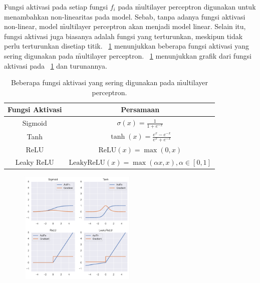     Fungsi aktivasi pada setiap fungsi $f_i$ pada \f{multilayer perceptron} digunakan untuk menambahkan non-linearitas pada model. Sebab, tanpa adanya fungsi aktivasi non-linear, model \f{multilayer perceptron} akan menjadi model linear. Selain itu, fungsi aktivasi juga biasanya adalah fungsi yang terturunkan, meskipun tidak perlu terturunkan disetiap titik. \tab~\ref{tab:activation-function} menunjukkan beberapa fungsi aktivasi yang sering digunakan pada \f{multilayer perceptron}. \pic~\ref{fig:activation-function} menunjukkan grafik dari fungsi aktivasi pada \tab~\ref{tab:activation-function} dan turunannya.
    \begin{table}[!ht]
        \centering
        \caption{Beberapa fungsi aktivasi yang sering digunakan pada \f{multilayer perceptron}.}
        \label{tab:activation-function}
        \begin{tabular}{|c|c|}
            \hline
            \textbf{Fungsi Aktivasi} & \textbf{Persamaan} \\
            \hline
            \hline
            Sigmoid & $\sigma(x) = \frac{1}{1 + e^{-x}}$ \\
            \hline
            Tanh & $\tanh(x) = \frac{e^x - e^{-x}}{e^x + e^{-x}}$ \\
            \hline
            ReLU & $\text{ReLU}(x) = \max(0, x)$ \\
            \hline
            Leaky ReLU & $\text{LeakyReLU}(x) = \max(\alpha x, x), \alpha \in [0, 1]$ \\
            \hline
        \end{tabular}
    \end{table}
    \begin{figure}[!ht]
        \centering
        \includegraphics[width=0.5\textwidth]{assets/pics/act_function.png}
        \label{fig:activation-function}
    \end{figure}


